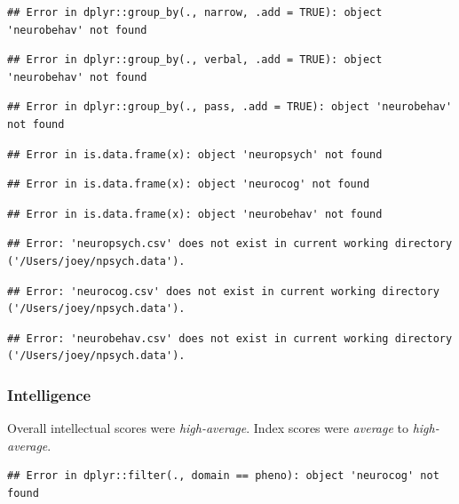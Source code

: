 \documentclass[%
numbers=noendperiod,
parskip=half,
bibliography=totoc,
DIV=calc,headsepline=true,
]{scrartcl}
\begin{document}
\begin{verbatim}
## Error in dplyr::group_by(., narrow, .add = TRUE): object 'neurobehav' not found
\end{verbatim}

\begin{verbatim}
## Error in dplyr::group_by(., verbal, .add = TRUE): object 'neurobehav' not found
\end{verbatim}

\begin{verbatim}
## Error in dplyr::group_by(., pass, .add = TRUE): object 'neurobehav' not found
\end{verbatim}

\begin{verbatim}
## Error in is.data.frame(x): object 'neuropsych' not found
\end{verbatim}

\begin{verbatim}
## Error in is.data.frame(x): object 'neurocog' not found
\end{verbatim}

\begin{verbatim}
## Error in is.data.frame(x): object 'neurobehav' not found
\end{verbatim}

\begin{verbatim}
## Error: 'neuropsych.csv' does not exist in current working directory ('/Users/joey/npsych.data').
\end{verbatim}

\begin{verbatim}
## Error: 'neurocog.csv' does not exist in current working directory ('/Users/joey/npsych.data').
\end{verbatim}

\begin{verbatim}
## Error: 'neurobehav.csv' does not exist in current working directory ('/Users/joey/npsych.data').
\end{verbatim}

\newpage

\hypertarget{intelligence}{%
\subsubsection{Intelligence}\label{intelligence}}

Overall intellectual scores were \emph{high-average}. Index scores were \emph{average} to
\emph{high-average}.

\begin{verbatim}
## Error in dplyr::filter(., domain == pheno): object 'neurocog' not found
\end{verbatim}
\end{document}
